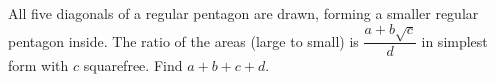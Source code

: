 All five diagonals of a regular pentagon are drawn, forming a smaller regular pentagon inside. The ratio of the areas (large to small) is $\dfrac{a+b\sqrt c}d$ in simplest form with $c$ squarefree. Find $a+b+c+d$.
